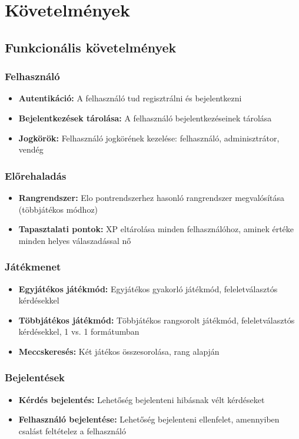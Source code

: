 \chapter{Követelmények}
\section{Funkcionális követelmények}
\subsection*{Felhasználó}
\begin{itemize}
    \item \textbf{Autentikáció:} A felhasználó tud regisztrálni és bejelentkezni
    \item \textbf{Bejelentkezések tárolása:} A felhasználó bejelentkezéseinek tárolása
    \item \textbf{Jogkörök:} Felhasználó jogkörének kezelése: felhasználó, adminisztrátor, vendég
\end{itemize}
\subsection*{Előrehaladás}
\begin{itemize}
    \item \textbf{Rangrendszer:} Elo\footnotemark{} pontrendszerhez hasonló rangrendszer megvalósítása (többjátékos módhoz)
    \item \textbf{Tapasztalati pontok:} XP\footnotemark{} eltárolása minden felhasználóhoz, aminek értéke minden helyes válaszadással nő
\end{itemize}
\subsection*{Játékmenet}
\begin{itemize}
    \item \textbf{Egyjátékos játékmód:} Egyjátékos gyakorló játékmód, feleletválasztós kérdésekkel
    \item \textbf{Többjátékos játékmód:} Többjátékos rangsorolt játékmód, feleletválasztós kérdésekkel, 1 vs. 1 formátumban
    \item \textbf{Meccskeresés:} Két játékos összesorolása, rang alapján
\end{itemize}
\subsection*{Bejelentések}
\begin{itemize}
    \item \textbf{Kérdés bejelentés:} Lehetőség bejelenteni hibásnak vélt kérdéseket
    \item \textbf{Felhasználó bejelentése:} Lehetőség bejelenteni ellenfelet, amennyiben csalást feltételez a felhasználó
\end{itemize}
\newpage
